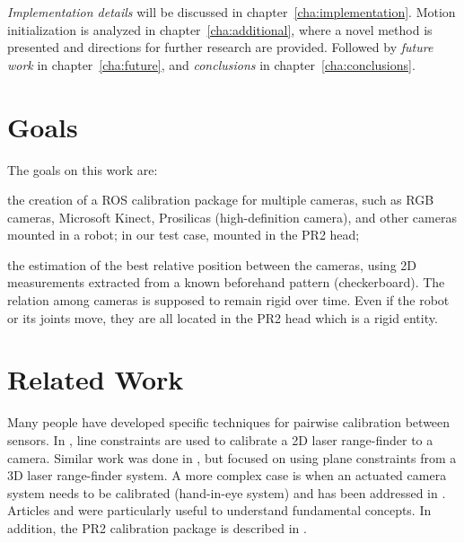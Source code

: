 \textit{Implementation details} will be discussed in chapter~\ref{cha:implementation}. Motion initialization is analyzed in chapter~\ref{cha:additional}, where a novel method is presented and directions for further research are provided. Followed by \textit{future work} in chapter~\ref{cha:future}, and \textit{conclusions} in chapter~\ref{cha:conclusions}.




\section{Goals}

The goals on this work are:
\begin{itemize*}
  \item the creation of a ROS calibration package for multiple cameras, such as RGB cameras, Microsoft Kinect, Prosilicas (high-definition camera), and other cameras mounted in a robot; in our test case, mounted in the PR2 head;

 \item the estimation of the best relative position between the cameras, using 2D measurements extracted from a known beforehand pattern (checkerboard). The relation among cameras is supposed to remain rigid over time. Even if the robot or its joints move, they are all located in the PR2 head which is a rigid entity.
\end{itemize*}




\section{Related Work}

Many people have developed specific techniques for pairwise calibration between
sensors. In \cite{Zhang04extrinsiccalibration}, line constraints are used to calibrate a 2D laser range-finder to a camera. Similar work was done in \cite{Unnikrishnan_fastextrinsic}, but focused on using plane constraints from a 3D laser range-finder system. A more complex case is when an actuated camera system needs to be calibrated (hand-in-eye system) and has been addressed in \cite{Horaud_hand-eyecalibration}. Articles \cite{Dynamic_camera_calibration} and \cite{4587681} were particularly useful to understand fundamental concepts. In addition, the PR2 calibration package is described in \cite{pr2_calibration_paper}.

